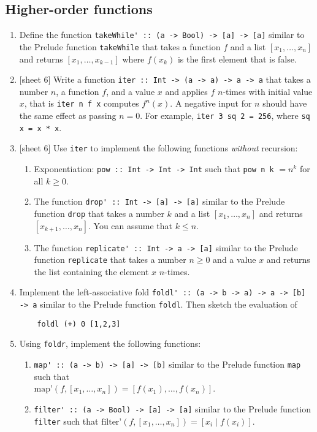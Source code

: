 \documentclass{article}
\begin{document}
\subsection{Higher-order functions}
\begin{enumerate}
\item Define the function \verb|takeWhile' :: (a -> Bool) -> [a] -> [a]| similar to the Prelude function \verb|takeWhile| that takes a function $f$ and a list $[x_1, \dots, x_n]$ and returns $[x_1, \dots, x_{k-1}]$ where $f(x_k)$ is the first element that is false.

\item {[sheet 6]} Write a function \verb|iter :: Int -> (a -> a) -> a -> a| that takes a number $n$, a function $f$, and a value $x$ and applies $f$ $n$-times with initial value $x$, that is \verb|iter n f x| computes $f^n(x)$. A negative input for $n$ should have the same effect as passing $n = 0$. For example, \verb|iter 3 sq 2 = 256|, where \verb|sq x = x * x|.

\item {[sheet 6]} Use \verb|iter| to implement the following functions \textit{without} recursion:
\begin{enumerate}
\item Exponentiation: \verb|pow :: Int -> Int -> Int| such that \verb|pow n k| $= n^k$ for all $k \geq 0$.
\item The function \verb|drop' :: Int -> [a] -> [a]| similar to the Prelude function \verb|drop| that takes a number $k$ and a list $[x_1, \dots, x_n]$ and returns $[x_{k+1}, \dots, x_n]$. You can assume that $k \leq n$.
\item The function \verb|replicate' :: Int -> a -> [a]| similar to the Prelude function \verb|replicate| that takes a number $n \geq 0$ and a value $x$ and returns the list containing the element $x$ $n$-times.
\end{enumerate}

\item Implement the left-associative fold \verb|foldl' :: (a -> b -> a) -> a -> [b] -> a| similar to the Prelude function \verb|foldl|. Then sketch the evaluation of
\begin{verbatim}
    foldl (+) 0 [1,2,3]
\end{verbatim}

\item Using \verb|foldr|, implement the following functions:
\begin{enumerate}
\item \verb|map' :: (a -> b) -> [a] -> [b]| similar to the Prelude function \verb|map| such that \\ $\text{map'}(f, [x_1, \dots, x_n]) = [f(x_1), \dots, f(x_n)]$.
\item \verb|filter' :: (a -> Bool) -> [a] -> [a]| similar to the Prelude function \verb|filter| such that $\text{filter'}(f, [x_1, \dots, x_n]) = [x_i \mid f(x_i)]$.
\end{enumerate}
\end{enumerate}
\end{document}
